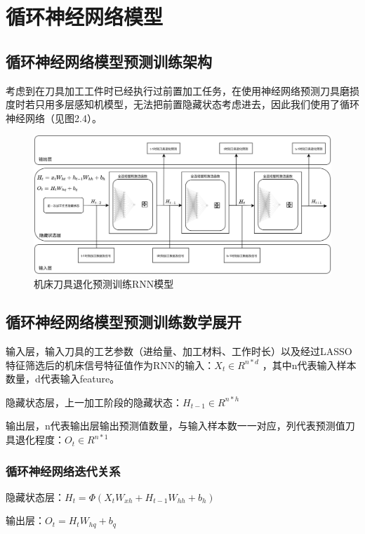 \section{循环神经网络模型}
% 
% 
\subsection{循环神经网络模型预测训练架构}
考虑到在刀具加工工件时已经执行过前置加工任务，在使用神经网络预测刀具磨损度时若只用多层感知机模型，无法把前置隐藏状态考虑进去，因此我们使用了循环神经网络（见图2.4）。\par
\begin{figure}[htp]
    \centering
    \includegraphics[width=14cm]{Chapter2/RNN architecture.png}
    \caption{机床刀具退化预测训练RNN模型}
\end{figure}
\subsection{循环神经网络模型预测训练数学展开}
输入层，输入刀具的工艺参数（进给量、加工材料、工作时长）以及经过LASSO特征筛选后的机床信号特征值作为RNN的输入：$X_t \in R^{n*d}$ ，其中n代表输入样本数量，d代表输入feature。\par
隐藏状态层，上一加工阶段的隐藏状态：$H_{t-1} \in R^{n*h}$ \par
输出层，n代表输出层输出预测值数量，与输入样本数一一对应，列代表预测值刀具退化程度：$O_t \in R^{n*1}$ \par
\subsubsection{循环神经网络迭代关系}
隐藏状态层：$H_t=\Phi(X_tW_{xh}+H_{t-1}W_{hh}+b_h)$ \par
输出层：$O_t=H_tW_{hq}+b_q$
